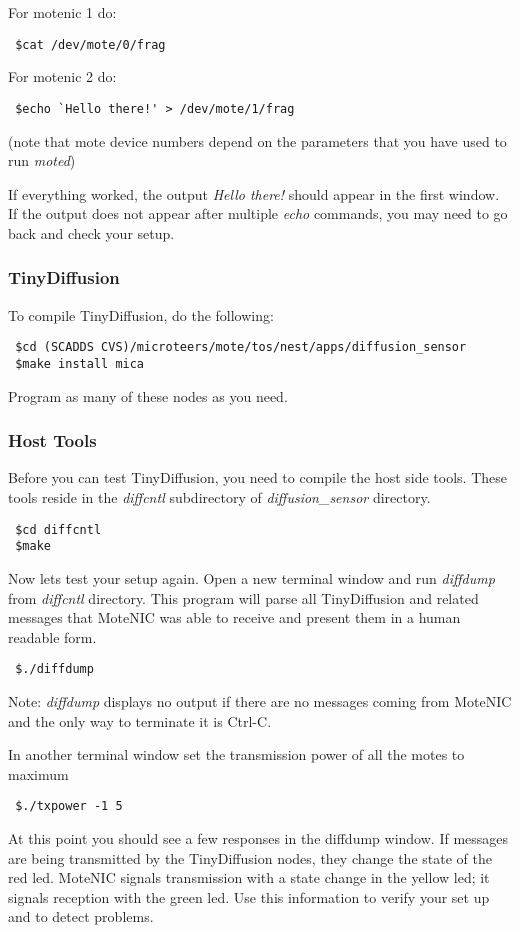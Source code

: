 \documentclass[11pt,onecolumn]{article}
\begin{document}
For motenic 1 do:
\begin{verbatim}
 $cat /dev/mote/0/frag
\end{verbatim}

For motenic 2 do:
\begin{verbatim}
 $echo `Hello there!' > /dev/mote/1/frag
\end{verbatim}
(note that mote device numbers depend on the parameters that you have
used to run \emph{moted})

If everything worked, the output \emph{Hello there!} should appear in the
first window. If the output does not appear after multiple
\emph{echo} commands, you may need to go back
and check your setup.

\subsubsection{TinyDiffusion}
\label{tinydiffusion}
To compile TinyDiffusion, do the following:
\begin{verbatim}
 $cd (SCADDS CVS)/microteers/mote/tos/nest/apps/diffusion_sensor
 $make install mica
\end{verbatim}
Program as many of these nodes as you need.
 
\subsubsection{Host Tools}
Before you can test TinyDiffusion, you need to compile the host side
tools. These tools reside in the \emph{diffcntl} subdirectory of
\emph{diffusion\_sensor} directory.

\begin{verbatim}
 $cd diffcntl
 $make 
\end{verbatim}
Now lets test your setup again. Open a new terminal window and run
\emph{diffdump} from \emph{diffcntl} directory. This program will
parse all TinyDiffusion and related messages that MoteNIC was able to
receive and present them in a human readable form.
\begin{verbatim}
 $./diffdump 
\end{verbatim}%

Note: \emph{diffdump} displays no output if there are no messages coming
from MoteNIC and the only way to terminate it is Ctrl-C.
 
In another terminal window set the transmission power of all the motes to maximum
\begin{verbatim}
 $./txpower -1 5
\end{verbatim}
At this point you should see a few responses in the diffdump window.
If messages are being transmitted by the TinyDiffusion nodes, they
change the state of the red led. MoteNIC signals transmission with a
state change in the yellow led; it signals reception with the green
led. Use this information to verify your set up and to detect problems.
\end{document}
